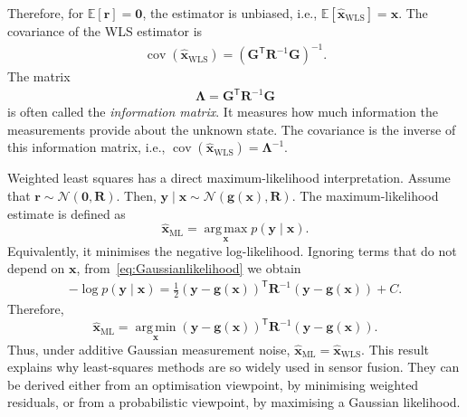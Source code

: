 \documentclass[11pt,oneside,openany]{book}
\begin{document}
Therefore, for $\mathbb{E}
\left[\mathbf{r}\right]
=\mathbf{0}$, the estimator is unbiased, i.e., $\mathbb{E} \left[\widehat{\mathbf{x}}_{\mathrm{WLS}} \right] = \mathbf{x}$. The covariance of the WLS estimator is
\begin{align}
\operatorname{cov}
\left(
\widehat{\mathbf{x}}_{\mathrm{WLS}}
\right)
=
\left(
\mathbf{G}^{\mathsf T}
\mathbf{R}^{-1}
\mathbf{G}
\right)^{-1}.
\end{align}
The matrix
\begin{align}
\mathbf{\Lambda}
=
\mathbf{G}^{\mathsf T}
\mathbf{R}^{-1}
\mathbf{G}
\end{align}
is often called the \emph{information matrix}. It measures how much information the measurements provide about the unknown state. The covariance is the inverse of this information matrix, i.e., $\operatorname{cov} \left( \widehat{\mathbf{x}}_{\mathrm{WLS}} \right) = \mathbf{\Lambda}^{-1}$.

Weighted least squares has a direct maximum-likelihood interpretation. Assume that $\mathbf{r}
\sim
\mathcal{N}
\left(
\mathbf{0},
\mathbf{R}
\right)$. Then, $\mathbf{y}\mid\mathbf{x}
\sim
\mathcal{N}
\left(
\mathbf{g}(\mathbf{x}),
\mathbf{R}
\right)$.
The maximum-likelihood estimate is defined as
\begin{equation}
\widehat{\mathbf{x}}_{\mathrm{ML}}
=
\operatorname*{arg\,max}_{\mathbf{x}}
p(\mathbf{y}\mid\mathbf{x}).
\end{equation}
Equivalently, it minimises the negative log-likelihood. Ignoring terms that do not depend on $\mathbf{x}$, from~\eqref{eq:Gaussianlikelihood} we obtain
\begin{align*}
-\log p(\mathbf{y}\mid\mathbf{x}) =
\frac{1}{2}
\left(\mathbf{y} - \mathbf{g}(\mathbf{x}) \right)^{\mathsf T}
\mathbf{R}^{-1}
\left(
\mathbf{y}
-
\mathbf{g}(\mathbf{x})
\right)
+
C.
\end{align*}
Therefore,
\begin{equation}
\widehat{\mathbf{x}}_{\mathrm{ML}}
=
\operatorname*{arg\,min}_{\mathbf{x}}
\left(
\mathbf{y}
-
\mathbf{g}(\mathbf{x})
\right)^{\mathsf T}
\mathbf{R}^{-1}
\left(
\mathbf{y}
-
\mathbf{g}(\mathbf{x})
\right).
\end{equation}
Thus, under additive Gaussian measurement noise, $\widehat{\mathbf{x}}_{\mathrm{ML}} = \widehat{\mathbf{x}}_{\mathrm{WLS}}$. This result explains why least-squares methods are so widely used in sensor fusion. They can be derived either from an optimisation viewpoint, by minimising weighted residuals, or from a probabilistic viewpoint, by maximising a Gaussian likelihood.
\end{document}
